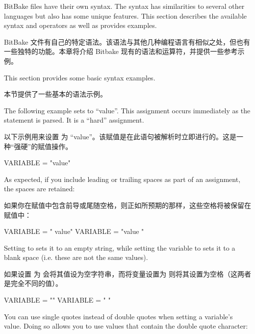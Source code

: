 

BitBake files have their own syntax. The syntax has similarities to several other languages but also has some unique features. This section describes the available syntax and operators as well as provides examples.

BitBake 文件有自己的特定语法。该语法与其他几种编程语言有相似之处，但也有一些独特的功能。本章将介绍 Bitbake 现有的语法和运算符，并提供一些参考示例。


This section provides some basic syntax examples.

本节提供了一些基本的语法示例。


\label{section:Basic Variable Setting}
The following example sets  to ``value''. This assignment occurs immediately as the statement is parsed. It is a ``hard'' assignment\footnotemark[1].

以下示例用来设置  为 ``value''。该赋值是在此语句被解析时立即进行的。这是一种``强硬''的赋值操作\footnotemark[1]。

\begin{pyglist}
VARIABLE = "value"
\end{pyglist}

As expected, if you include leading or trailing spaces as part of an assignment, the spaces are retained:

如果你在赋值中包含前导或尾随空格，则正如所预期的那样，这些空格将被保留在赋值中：

\begin{pyglist}
VARIABLE = " value"
VARIABLE = "value "
\end{pyglist}

Setting  to  sets it to an empty string, while setting the variable to   sets it to a blank space (i.e. these are not the same values).

如果设置  为  会将其值设为空字符串，而将变量设置为 则将其设置为空格（这两者是完全不同的值）。

\begin{pyglist}
VARIABLE = ""
VARIABLE = " "
\end{pyglist}

You can use single quotes instead of double quotes when setting a variable's value. Doing so allows you to use values that contain the double quote character:

